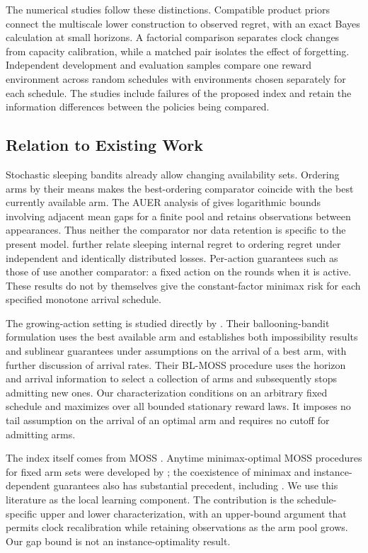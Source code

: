 The numerical studies follow these distinctions. Compatible product priors connect the multiscale lower construction to observed regret, with an exact Bayes calculation at small horizons. A factorial comparison separates clock changes from capacity calibration, while a matched pair isolates the effect of forgetting. Independent development and evaluation samples compare one reward environment across random schedules with environments chosen separately for each schedule. The studies include failures of the proposed index and retain the information differences between the policies being compared.

\subsection{Relation to Existing Work}
Stochastic sleeping bandits already allow changing availability sets. Ordering arms by their means makes the best-ordering comparator coincide with the best currently available arm. The AUER analysis of \citet{kleinberg2008sleeping} gives logarithmic bounds involving adjacent mean gaps for a finite pool and retains observations between appearances. Thus neither the comparator nor data retention is specific to the present model. \citet{gaillard2023sleeping} further relate sleeping internal regret to ordering regret under independent and identically distributed losses. Per-action guarantees such as those of \citet{nguyen2024sleeping} use another comparator: a fixed action on the rounds when it is active. These results do not by themselves give the constant-factor minimax risk for each specified monotone arrival schedule.

The growing-action setting is studied directly by \citet{ghalme2021ballooning}. Their ballooning-bandit formulation uses the best available arm and establishes both impossibility results and sublinear guarantees under assumptions on the arrival of a best arm, with further discussion of arrival rates. Their BL-MOSS procedure uses the horizon and arrival information to select a collection of arms and subsequently stops admitting new ones. Our characterization conditions on an arbitrary fixed schedule and maximizes over all bounded stationary reward laws. It imposes no tail assumption on the arrival of an optimal arm and requires no cutoff for admitting arms.

The index itself comes from MOSS \citep{audibert2009minimax}. Anytime minimax-optimal MOSS procedures for fixed arm sets were developed by \citet{degenne2016anytime}; the coexistence of minimax and instance-dependent guarantees also has substantial precedent, including \citet{menard2017minimax}. We use this literature as the local learning component. The contribution is the schedule-specific upper and lower characterization, with an upper-bound argument that permits clock recalibration while retaining observations as the arm pool grows. Our gap bound is not an instance-optimality result.

